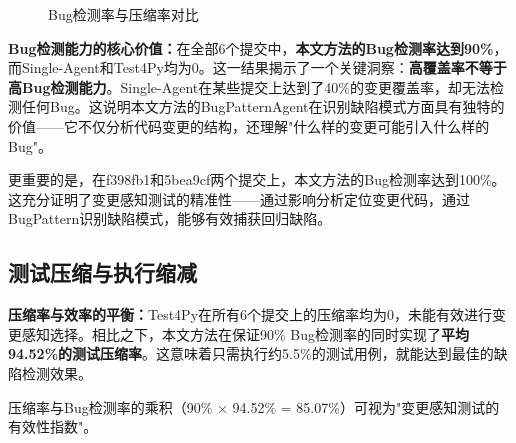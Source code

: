 \begin{figure}[htbp]
\centering
{}
\caption{Bug检测率与压缩率对比}
\label{fig:bug-detection-radar}
\end{figure}

\textbf{Bug检测能力的核心价值：}在全部6个提交中，\textbf{本文方法的Bug检测率达到90\%}，而Single-Agent和Test4Py均为0。这一结果揭示了一个关键洞察：\textbf{高覆盖率不等于高Bug检测能力}。Single-Agent在某些提交上达到了40\%的变更覆盖率，却无法检测任何Bug。这说明本文方法的BugPatternAgent在识别缺陷模式方面具有独特的价值——它不仅分析代码变更的结构，还理解"什么样的变更可能引入什么样的Bug"。

更重要的是，在f398fb1和5bea9cf两个提交上，本文方法的Bug检测率达到100\%。这充分证明了变更感知测试的精准性——通过影响分析定位变更代码，通过BugPattern识别缺陷模式，能够有效捕获回归缺陷。

\subsection{测试压缩与执行缩减}
\label{ssec:expB_compression}

\textbf{压缩率与效率的平衡：}Test4Py在所有6个提交上的压缩率均为0，未能有效进行变更感知选择。相比之下，本文方法在保证90\% Bug检测率的同时实现了\textbf{平均94.52\%的测试压缩率}。这意味着只需执行约5.5\%的测试用例，就能达到最佳的缺陷检测效果。

压缩率与Bug检测率的乘积（90\% × 94.52\% = 85.07\%）可视为"变更感知测试的有效性指数"。

